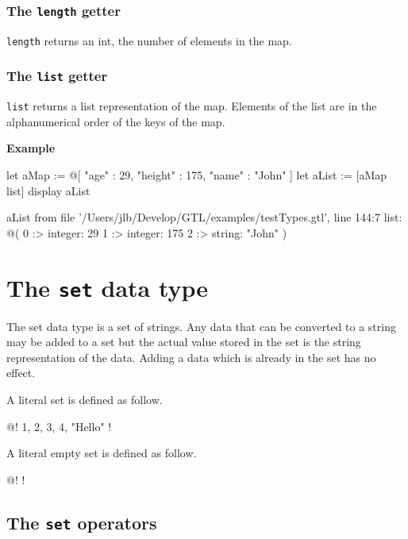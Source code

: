 \documentclass[10pt,openright,twosides]{report}
\newcommand{\gtltype}[1]{{\small\ttfamily #1}}
\newcommand{\gtlinline}[1]{\colorbox{light-blue}{\lstinline[language=gtl]{#1}}}
\newcommand{\example}{\vspace{.75em}\noindent\textbf{Example}\vspace{0em}}
\begin{document}
\subsubsection{The \texttt{length} getter}

\gtlinline{length} returns an int, the number of elements in the map.


\subsubsection{The \texttt{list} getter}
\label{sec:listGetterOnMap}

\gtlinline{list} returns a list representation of the map. Elements of the list are in the alphanumerical order of the keys of the map.

\example
\begin{gtl}
let aMap := @[ "age" : 29, "height" : 175, "name" : "John" ]
let aList := [aMap list]
display aList
\end{gtl}
\begin{console}
aList from file '/Users/jlb/Develop/GTL/examples/testTypes.gtl', line 144:7
    list: @(
        0 :>
            integer: 29
        1 :>
            integer: 175
        2 :>
            string: "John"
    )
\end{console}

\section{The \texttt{set} data type}

The \gtltype{set} data type is a set of strings. Any data that can be converted to a string may be added to a set but the actual value stored in the set is the string representation of the data. Adding a data which is already in the set has no effect.

A literal set is defined as follow.

\begin{gtl}
@! 1, 2, 3, 4, "Hello" !
\end{gtl}

A literal empty set is defined as follow.

\begin{gtl}
@! !
\end{gtl}

\subsection{The \texttt{set} operators}
\end{document}
